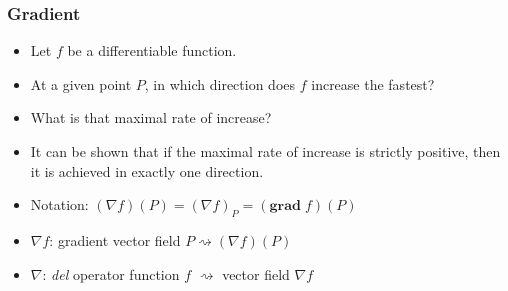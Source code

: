 \begin{frame}
\frametitle{Gradient}
\begin{itemize}
\item Let $f$ be a differentiable function.
\item At a given point $P$, in which direction does $f$ increase the fastest?
\item<2-> What is that maximal rate of increase?
\item<3-> It can be shown that if the maximal rate of increase is strictly positive, then it is achieved in exactly one direction. 
\item<5-> Notation: $(\nabla f)(P) = (\nabla f)_P = (\textbf{grad} \;f)(P)$
\item<6-> $\nabla f$: gradient vector field \hspace{2cm}
$P \rightsquigarrow (\nabla f)(P)$
\item<7-> $\nabla$: \emph{del} operator \hspace{2cm}
function $f$ $\rightsquigarrow$ vector field $\nabla f$
\end{itemize}

\end{frame}